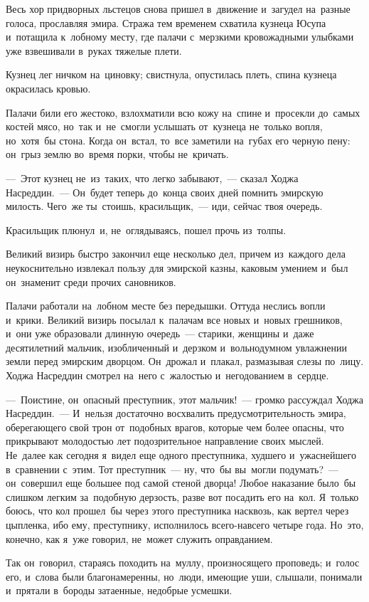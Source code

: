 \documentclass[12pt,a4paper]{book}
\begin{document}
Весь хор придворных льстецов снова пришел в~движение и~загудел на~разные голоса, прославляя эмира. Стража тем временем схватила кузнеца Юсупа и~потащила к~лобному месту, где палачи с~мерзкими кровожадными улыбками уже взвешивали в~руках тяжелые плети.

Кузнец лег ничком на~циновку; свистнула, опустилась плеть, спина кузнеца окрасилась кровью.

Палачи били его жестоко, взлохматили всю кожу на~спине и~просекли до~самых костей мясо, но~так и~не~смогли услышать от~кузнеца не~только вопля, но~хотя~бы стона. Когда он~встал, то~все заметили на~губах его черную пену: он~грыз землю во~время порки, чтобы не~кричать.

—~Этот кузнец не~из~таких, что легко забывают,~— сказал Ходжа Насреддин.~— Он~будет теперь до~конца своих дней помнить эмирскую милость. Чего~же ты~стоишь, красильщик,~— иди, сейчас твоя очередь.

Красильщик плюнул~и, не~оглядываясь, пошел прочь из~толпы.

Великий визирь быстро закончил еще несколько дел, причем из~каждого дела неукоснительно извлекал пользу для эмирской казны, каковым умением и~был он~знаменит среди прочих сановников.

Палачи работали на~лобном месте без передышки. Оттуда неслись вопли и~крики. Великий визирь посылал к~палачам все новых и~новых грешников, и~они уже образовали длинную очередь~— старики, женщины и~даже десятилетний мальчик, изобличенный и~дерзком и~вольнодумном увлажнении земли перед эмирским дворцом. Он~дрожал и~плакал, размазывая слезы по~лицу. Ходжа Насреддин смотрел на~него с~жалостью и~негодованием в~сердце.

—~Поистине, он~опасный преступник, этот мальчик!~— громко рассуждал Ходжа Насреддин.~— И~нельзя достаточно восхвалить предусмотрительность эмира, оберегающего свой трон от~подобных врагов, которые чем более опасны, что прикрывают молодостью лет подозрительное направление своих мыслей. Не~далее как сегодня я~видел еще одного преступника, худшего и~ужаснейшего в~сравнении с~этим. Тот преступник~— ну, что~бы вы~могли подумать?~— он~совершил еще большее под самой стеной дворца! Любое наказание было~бы слишком легким за~подобную дерзость, разве вот посадить его на~кол. Я~только боюсь, что кол прошел~бы через этого преступника насквозь, как вертел через цыпленка, ибо ему, преступнику, исполнилось всего-навсего четыре года. Но~это, конечно, как я~уже говорил, не~может служить оправданием.

Так он~говорил, стараясь походить на~муллу, произносящего проповедь; и~голос его, и~слова были благонамеренны, но~люди, имеющие уши, слышали, понимали и~прятали в~бороды затаенные, недобрые усмешки.
\end{document}
